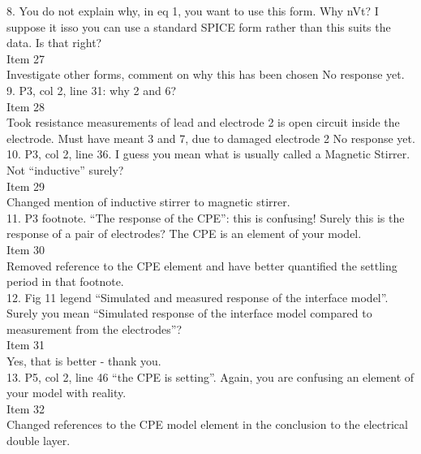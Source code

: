\documentclass[journal, a4paper]{IEEEtran}
\begin{document}
{{8. You do not explain why, in eq 1, you want to use this form. Why nVt? I suppose it isso you can use a standard SPICE form rather than this suits the data. Is that right?\\
{\color{OliveGreen} 
    Item 27\\
    {\color{Red} Investigate other forms, comment on why this has been chosen}
    No response yet.
}\\

9. P3, col 2, line 31: why 2 and 6?\\
{\color{OliveGreen}
    Item 28\\
    {\color{Red} Took resistance measurements of lead and electrode 2 is open circuit inside the electrode. Must have meant 3 and 7, due to damaged electrode 2}
    No response yet.
}\\

10. P3, col 2, line 36. I guess you mean what is usually called a Magnetic Stirrer. Not ``inductive'' surely?\\
{\color{OliveGreen} 
    Item 29\\
    Changed mention of inductive stirrer to magnetic stirrer.
}\\

11. P3 footnote. ``The response of the CPE'': this is confusing! Surely this is the response of a pair of electrodes? The CPE is an element of your model.\\
{\color{OliveGreen} 
    Item 30\\
    Removed reference to the CPE element and have better quantified the settling period in that footnote.
}\\

12. Fig 11 legend ``Simulated and measured response of the interface model''. Surely you mean ``Simulated response of the interface model compared to measurement from the electrodes''?\\
{\color{OliveGreen}
    Item 31\\
    Yes, that is better - thank you.
}\\

13. P5, col 2, line 46 ``the CPE is setting''. Again, you are confusing an element of your model with reality.\\
{\color{OliveGreen}
    Item 32\\
    Changed references to the CPE model element in the conclusion to the electrical double layer.
}\\

}}
\end{document}
